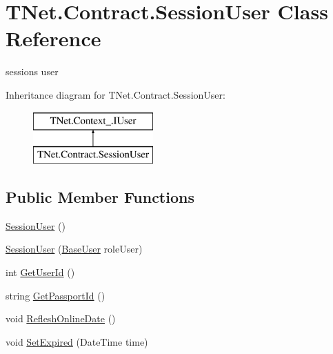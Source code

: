 \hypertarget{class_t_net_1_1_contract_1_1_session_user}{}\section{T\+Net.\+Contract.\+Session\+User Class Reference}
\label{class_t_net_1_1_contract_1_1_session_user}


session\textquotesingle{}s user  


Inheritance diagram for T\+Net.\+Contract.\+Session\+User\+:\begin{figure}[H]
\begin{center}
\leavevmode
\includegraphics[height=2.000000cm]{class_t_net_1_1_contract_1_1_session_user}
\end{center}
\end{figure}
\subsection*{Public Member Functions}
\begin{DoxyCompactItemize}
\item 
\mbox{\hyperlink{class_t_net_1_1_contract_1_1_session_user_aadcbf64cded4e58e0545c1dce6b52b3e}{Session\+User}} ()
\item 
\mbox{\hyperlink{class_t_net_1_1_contract_1_1_session_user_ab849c9fc0d6a462fb46e584d292f0dba}{Session\+User}} (\mbox{\hyperlink{class_t_net_1_1_context___1_1_base_user}{Base\+User}} role\+User)
\item 
int \mbox{\hyperlink{class_t_net_1_1_contract_1_1_session_user_a3874ee6c15b00ec73fc822a1733d1fc2}{Get\+User\+Id}} ()
\item 
string \mbox{\hyperlink{class_t_net_1_1_contract_1_1_session_user_a22fcdffa10ecb3d862aea43e081199d0}{Get\+Passport\+Id}} ()
\item 
void \mbox{\hyperlink{class_t_net_1_1_contract_1_1_session_user_a972f612fe19d4de10d41824553eb6859}{Reflesh\+Online\+Date}} ()
\item 
void \mbox{\hyperlink{class_t_net_1_1_contract_1_1_session_user_ac875074672d0a372faabe3f9e4b5805b}{Set\+Expired}} (Date\+Time time)
\end{DoxyCompactItemize}
